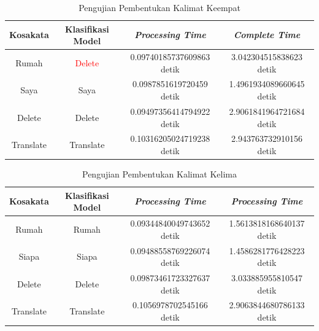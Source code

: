 \begin{longtable}{|c|c|c|c|}
  \caption{Pengujian Pembentukan Kalimat Keempat}
  \label{tb:prediksikombinasi4}                                   \\
  \hline
  \rowcolor[HTML]{C0C0C0}
  \textbf{Kosakata} & \textbf{Klasifikasi Model} & \textbf{\emph{Processing Time}} & \textbf{\emph{Complete Time}}\\
  \hline
  Rumah               & \textcolor{red}{Delete}       & 0.09740185737609863 detik                           & 3.042304515838623 detik                                 \\
  Saya                & Saya                          & 0.0987851619720459 detik                            & 1.4961934089660645 detik                                  \\
  Delete              & Delete                        & 0.09497356414794922 detik                           & 2.9061841964721684 detik                                  \\
  Translate           & Translate                     & 0.10316205024719238 detik                           & 2.943763732910156 detik                                 \\
  \hline
\end{longtable}

\newpage
\begin{longtable}{|c|c|c|c|}
  \caption{Pengujian Pembentukan Kalimat Kelima}
  \label{tb:prediksikombinasi5}                                   \\
  \hline
  \rowcolor[HTML]{C0C0C0}
  \textbf{Kosakata} & \textbf{Klasifikasi Model} & \textbf{\emph{Processing Time}} & \textbf{\emph{Processing Time}}\\
  \hline
  Rumah               & Rumah                         & 0.09344840049743652 detik                           & 1.5613818168640137 detik                                  \\
  Siapa               & Siapa                         & 0.09488558769226074 detik                           & 1.4586281776428223 detik                                  \\
  Delete              & Delete                        & 0.09873461723327637 detik                           & 3.033885955810547  detik                                 \\
  Translate           & Translate                     & 0.1056978702545166 detik                            & 2.9063844680786133 detik                                  \\
  \hline
\end{longtable}

